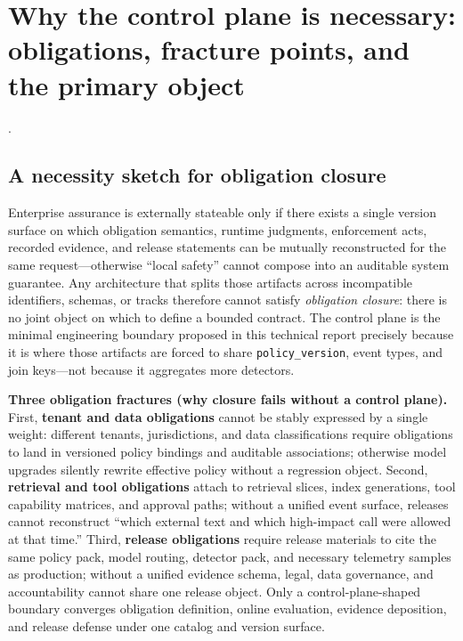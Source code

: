 \documentclass[11pt,a4paper]{report}
\begin{document}
\section{Why the control plane is necessary: obligations, fracture points, and the primary object}\label{sec:why-control-plane-necessary}
\ControlPlane{}.

\subsection{A necessity sketch for obligation closure}
Enterprise assurance is externally stateable only if there exists a single version surface on which obligation semantics, runtime judgments, enforcement acts, recorded evidence, and release statements can be mutually reconstructed for the same request---otherwise ``local safety'' cannot compose into an auditable system guarantee. Any architecture that splits those artifacts across incompatible identifiers, schemas, or tracks therefore cannot satisfy \emph{obligation closure}: there is no joint object on which to define a bounded contract. The control plane is the minimal engineering boundary proposed in this technical report precisely because it is where those artifacts are forced to share \texttt{policy\_version}, event types, and join keys---not because it aggregates more detectors.

\noindent\textbf{Three obligation fractures (why closure fails without a control plane).} First, \textbf{tenant and data obligations} cannot be stably expressed by a single weight: different tenants, jurisdictions, and data classifications require obligations to land in versioned policy bindings and auditable associations; otherwise model upgrades silently rewrite effective policy without a regression object. Second, \textbf{retrieval and tool obligations} attach to retrieval slices, index generations, tool capability matrices, and approval paths; without a unified event surface, releases cannot reconstruct “which external text and which high-impact call were allowed at that time.” Third, \textbf{release obligations} require release materials to cite the same policy pack, model routing, detector pack, and necessary telemetry samples as production; without a unified evidence schema, legal, data governance, and accountability cannot share one release object. Only a control-plane-shaped boundary converges obligation definition, online evaluation, evidence deposition, and release defense under one catalog and version surface.
\end{document}
